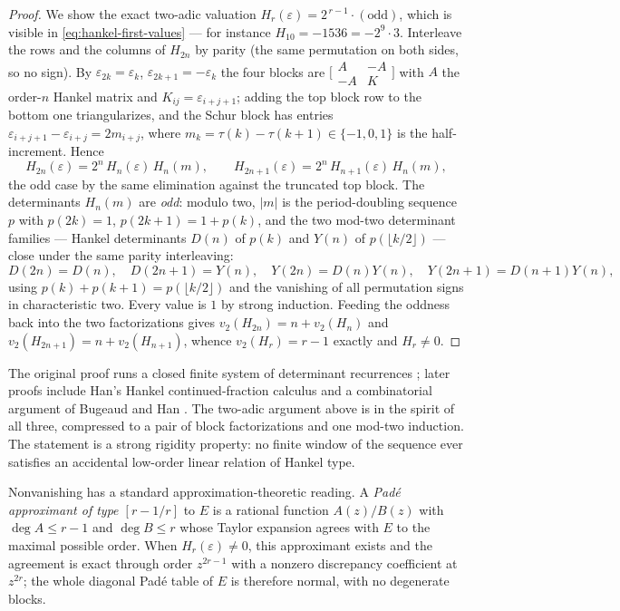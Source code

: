 \documentclass[11pt,oneside]{article}
\numberwithin{equation}{section}
\theoremstyle{definition}
\theoremstyle{remark}
\newcommand{\eps}{\varepsilon}
\begin{document}
\begin{proof}
We show the exact two-adic valuation
\(H_r(\eps)=2^{\,r-1}\cdot(\text{odd})\), which is visible in
\eqref{eq:hankel-first-values} --- for instance
\(H_{10}=-1536=-2^9\cdot3\).  Interleave the rows and the columns of
\(H_{2n}\) by parity (the same permutation on both sides, so no sign).
By \(\eps_{2k}=\eps_k\), \(\eps_{2k+1}=-\eps_k\) the four blocks
are \(\bigl[\begin{smallmatrix}A&-A\\-A&K\end{smallmatrix}\bigr]\)
with \(A\) the order-\(n\) Hankel matrix and
\(K_{ij}=\eps_{i+j+1}\); adding the top block row to the bottom one
triangularizes, and the Schur block has entries
\(\eps_{i+j+1}-\eps_{i+j}=2m_{i+j}\), where
\(m_k=\tau(k)-\tau(k+1)\in\{-1,0,1\}\) is the half-increment.
Hence
\[
  H_{2n}(\eps)=2^n\,H_n(\eps)\,H_n(m),
  \qquad
  H_{2n+1}(\eps)=2^n\,H_{n+1}(\eps)\,H_n(m),
\]
the odd case by the same elimination against the truncated top block.
The determinants \(H_n(m)\) are \emph{odd}: modulo two, \(|m|\) is
the period-doubling sequence \(p\) with \(p(2k)=1\),
\(p(2k+1)=1+p(k)\), and the two mod-two determinant families ---
Hankel determinants \(D(n)\) of \(p(k)\) and \(Y(n)\) of
\(p(\lfloor k/2\rfloor)\) --- close under the same parity
interleaving:
\[
  D(2n)=D(n),\quad D(2n+1)=Y(n),\quad
  Y(2n)=D(n)Y(n),\quad Y(2n+1)=D(n+1)Y(n),
\]
using \(p(k)+p(k+1)=p(\lfloor k/2\rfloor)\) and the vanishing of
all permutation signs in characteristic two.  Every value is \(1\) by
strong induction.  Feeding the oddness back into the two
factorizations gives \(v_2(H_{2n})=n+v_2(H_n)\) and
\(v_2(H_{2n+1})=n+v_2(H_{n+1})\), whence \(v_2(H_r)=r-1\) exactly
and \(H_r\ne0\).
\end{proof}

The original proof runs a closed finite system of determinant recurrences
\cite{apww1998}; later proofs include Han's Hankel continued-fraction
calculus \cite{han2014} and a combinatorial argument of Bugeaud and Han
\cite{bugeaudHan2014}.  The two-adic argument above is in the spirit of
all three, compressed to a pair of block factorizations and one mod-two
induction.  The statement is a strong rigidity property: no
finite window of the sequence ever satisfies an accidental low-order linear
relation of Hankel type.

Nonvanishing has a standard approximation-theoretic reading.  A \emph{Pad\'e
approximant of type \([r-1/r]\)} to \(E\) is a rational function
\(A(z)/B(z)\) with \(\deg A\le r-1\) and \(\deg B\le r\) whose Taylor
expansion agrees with \(E\) to the maximal possible order.  When
\(H_r(\eps)\ne0\), this approximant exists and the agreement is exact
through order \(z^{2r-1}\) with a nonzero discrepancy coefficient at
\(z^{2r}\); the whole diagonal Pad\'e table of \(E\) is therefore normal,
with no degenerate blocks.
\end{document}

